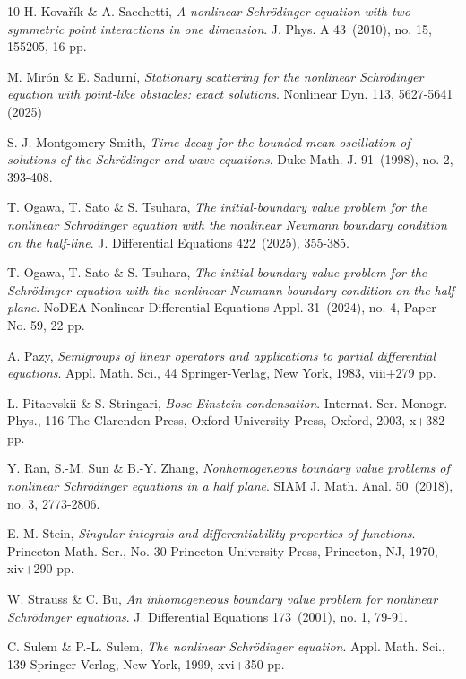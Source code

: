 \documentclass[11pt,letter]{amsart}
\numberwithin{equation}{section}
\numberwithin{equation}{section}
\begin{document}
\begin{thebibliography}{10}
H. Kovařík \& A. Sacchetti, \emph{A nonlinear Schr\"odinger equation with two symmetric point interactions in one dimension}.
J. Phys. A 43~(2010), no. 15, 155205, 16 pp.


M. Mir\'on \& E. Sadurn\'i, \emph{Stationary scattering for the nonlinear Schr\"odinger equation with point-like obstacles: exact solutions}. Nonlinear Dyn. 113, 5627-5641 (2025)

S. J. Montgomery-Smith,  \emph{Time decay for the bounded mean oscillation of solutions of the Schr\"odinger and wave equations}.
Duke Math. J. 91~(1998), no. 2, 393-408.



T. Ogawa, T. Sato \& S. Tsuhara, \emph{The initial-boundary value problem for the nonlinear Schr\"odinger equation with the nonlinear Neumann boundary condition on the half-line}.
J. Differential Equations 422~(2025), 355-385.

T. Ogawa, T. Sato \& S. Tsuhara, \emph{The initial-boundary value problem for the Schr\"odinger equation with the nonlinear Neumann boundary condition on the half-plane}.
NoDEA Nonlinear Differential Equations Appl. 31~(2024), no. 4, Paper No. 59, 22 pp.

A. Pazy, \emph{Semigroups of linear operators and applications to partial differential equations}.
Appl. Math. Sci., 44
Springer-Verlag, New York, 1983, viii+279 pp.

L. Pitaevskii \& S. Stringari, \emph{Bose-Einstein condensation}.
Internat. Ser. Monogr. Phys., 116
The Clarendon Press, Oxford University Press, Oxford, 2003, x+382 pp.

Y. Ran, S.-M. Sun \& B.-Y. Zhang, \emph{
Nonhomogeneous boundary value problems of nonlinear Schr\"odinger equations in a half plane}.
SIAM J. Math. Anal. 50~(2018), no. 3, 2773-2806.

E. M. Stein, \emph{Singular integrals and differentiability properties of functions}.
Princeton Math. Ser., No. 30
Princeton University Press, Princeton, NJ, 1970, xiv+290 pp.

W. Strauss \& C. Bu, \emph{
An inhomogeneous boundary value problem for nonlinear Schr\"odinger equations}.
J. Differential Equations 173~(2001), no. 1, 79-91.


C. Sulem \& P.-L. Sulem, \emph{The nonlinear Schr\"odinger equation}.
Appl. Math. Sci., 139
Springer-Verlag, New York, 1999, xvi+350 pp.


\end{thebibliography}
\end{document}

